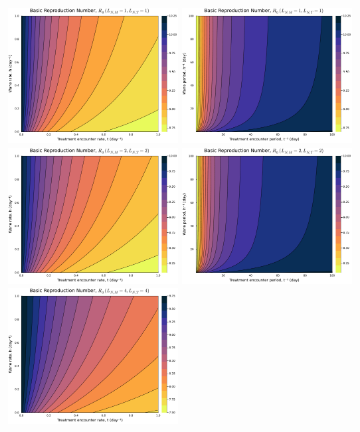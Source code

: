 \documentclass[11pt]{article}
\begin{document}
\begin{figure}[H]
  \centering
  \includegraphics[width=0.4\textwidth]{../../fig/R0_rates_txh_1x1_uncal.pdf}
  \includegraphics[width=0.4\textwidth]{../../fig/R0_periods_txh_1x1_uncal.pdf}\\
  \includegraphics[width=0.4\textwidth]{../../fig/R0_rates_txh_2x2_uncal.pdf}
  \includegraphics[width=0.4\textwidth]{../../fig/R0_periods_txh_2x2_uncal.pdf}\\
  \includegraphics[width=0.4\textwidth]{../../fig/R0_rates_txh_4x4_uncal.pdf}

\end{figure}
\end{document}
